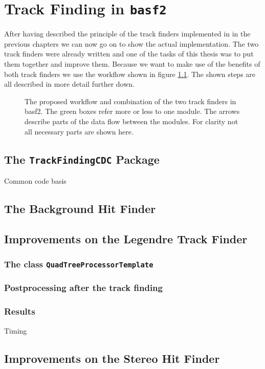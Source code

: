 \chapter{Track Finding in \texttt{basf2}}

After having described the principle of the track finders implemented in \basf in the previous chapters we can now go on to show the actual implementation. The two track finders were already written and one of the tasks of this thesis was to put them together and improve them. Because we want to make use of the benefits of both track finders we use the workflow shown in figure \ref{fig-workflow}. The shown steps are all described in more detail further down.

\begin{figure}
 \caption{The proposed workflow and combination of the two track finders in basf2. The green boxes refer more or less to one module. The arrows describe parts of the data flow between the modules. For clarity not all necessary parts are shown here.}
 \label{fig-workflow}
\end{figure}


\section{The \texttt{TrackFindingCDC} Package}
Common code basis

\section{The Background Hit Finder}

\section{Improvements on the Legendre Track Finder}
\subsection{The class \texttt{QuadTreeProcessorTemplate}}
\subsection{Postprocessing after the track finding}
\subsection{Results}
Timing

\section{Improvements on the Stereo Hit Finder}
